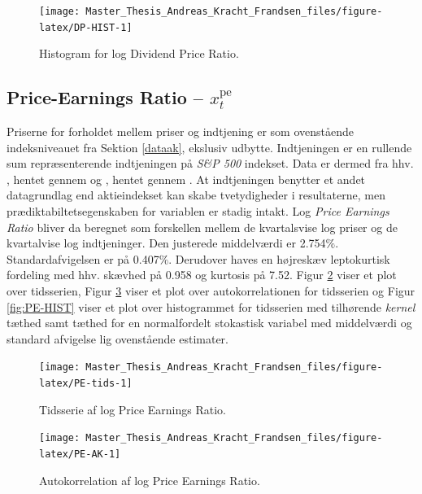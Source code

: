 \documentclass[
  a4paper,
  oneside]{memoir}
\begin{document}
\begin{figure}[H]

{\centering \texttt{[image: Master\_Thesis\_Andreas\_Kracht\_Frandsen\_files/figure-latex/DP-HIST-1]} 

}

\caption{Histogram for log Dividend Price Ratio.}\label{fig:DP-HIST}
\end{figure}

\hypertarget{price-earnings-ratio-x_ttextpe}{%
\subsection{\texorpdfstring{Price-Earnings Ratio -- \(x_t^{\text{pe}}\)}{Price-Earnings Ratio -- x\_t\^{}\{\textbackslash text\{pe\}\}}}\label{price-earnings-ratio-x_ttextpe}}

Priserne for forholdet mellem priser og indtjening er som ovenstående indeksniveauet fra Sektion \ref{dataak}, ekslusiv udbytte. Indtjeningen er en rullende sum repræsenterende indtjeningen på \emph{S\&P 500} indekset. Data er dermed fra hhv. \citep{CRSPakt}, hentet gennem \citep{WRDSakt} og \citep{Shiller2020}, hentet gennem \citep{Goyal2007}. At indtjeningen benytter et andet datagrundlag end aktieindekset kan skabe tvetydigheder i resultaterne, men prædiktabiltetsegenskaben for variablen er stadig intakt. Log \emph{Price Earnings Ratio} bliver da beregnet som forskellen mellem de kvartalsvise log priser og de kvartalvise log indtjeninger. Den justerede middelværdi er 2.754\(\%\). Standardafvigelsen er på 0.407\(\%\). Derudover haves en højreskæv leptokurtisk fordeling med hhv. skævhed på 0.958 og kurtosis på 7.52. Figur \ref{fig:PE-tids} viser et plot over tidsserien, Figur \ref{fig:PE-AK} viser et plot over autokorrelationen for tidsserien og Figur \ref{fig:PE-HIST} viser et plot over histogrammet for tidsserien med tilhørende \emph{kernel} tæthed samt tæthed for en normalfordelt stokastisk variabel med middelværdi og standard afvigelse lig ovenstående estimater.

\begin{figure}[H]

{\centering \texttt{[image: Master\_Thesis\_Andreas\_Kracht\_Frandsen\_files/figure-latex/PE-tids-1]} 

}

\caption{Tidsserie af log Price Earnings Ratio.}\label{fig:PE-tids}
\end{figure}

\begin{figure}[H]

{\centering \texttt{[image: Master\_Thesis\_Andreas\_Kracht\_Frandsen\_files/figure-latex/PE-AK-1]} 

}

\caption{Autokorrelation af log Price Earnings Ratio.}\label{fig:PE-AK}
\end{figure}
\end{document}
